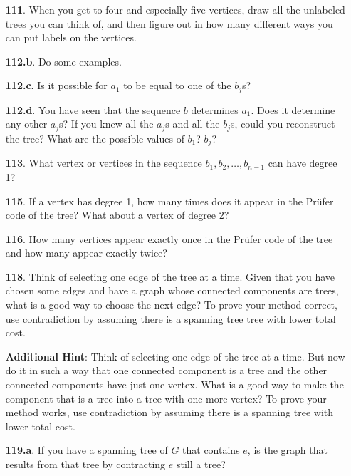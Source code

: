 \documentclass[10pt,]{book}
\theoremstyle{plain}
\theoremstyle{definition}
\theoremstyle{definition}
\numberwithin{equation}{chapter}
\begin{document}
\begin{itemize}[itemsep=1em]
\item[\textbf{111}.]When you get to four and especially five vertices, draw all the unlabeled trees you can think of, and then figure out in how many different ways you can put labels on the vertices.%

\item[\textbf{112.b}.]Do some examples.%

\item[\textbf{112.c}.]Is it possible for \(a_1\) to be equal to one of the \(b_j\)s?%

\item[\textbf{112.d}.]You have seen that the sequence \(b\) determines \(a_1\). Does it determine any other \(a_j\)s? If you knew all the \(a_j\)s and all the \(b_j\)s, could you reconstruct the tree? What are the possible values of \(b_1\)? \(b_j\)?%

\item[\textbf{113}.]What vertex or vertices in the sequence \(b_1,b_2,\ldots,b_{n-1}\) can have degree 1?%

\item[\textbf{115}.]If a vertex has degree 1, how many times does it appear in the Prüfer code of the tree? What about a vertex of degree 2?%

\item[\textbf{116}.]How many vertices appear exactly once in the Prüfer code of the tree and how many appear exactly twice?%

\item[\textbf{118}.]Think of selecting one edge of the tree at a time. Given that you have chosen some edges and have a graph whose connected components are trees, what is a good way to choose the next edge? To prove your method correct, use contradiction by assuming there is a spanning tree tree with lower total cost.%

\par\smallskip
\noindent\textbf{Additional Hint}: Think of selecting one edge of the tree at a time. But now do it in such a way that one connected component is a tree and the other connected components have just one vertex. What is a good way to make the component that is a tree into a tree with one more vertex? To prove your method works, use contradiction by assuming there is a spanning tree with lower total cost.%

\item[\textbf{119.a}.]If you have a spanning tree of \(G\) that contains \(e\), is the graph that results from that tree by contracting \(e\) still a tree?%


\end{itemize}
\end{document}
